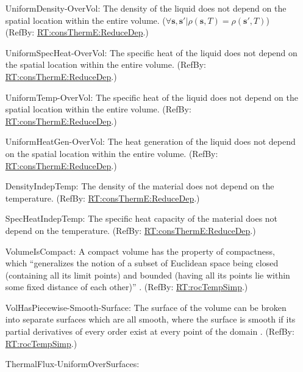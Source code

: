 \documentclass[12pt]{article}
\begin{document}
\begin{itemize}
\item[UniformDensity-OverVol:\phantomsection\label{assumpUnifDens}]{The density
of the liquid does not depend on the spatial location within the entire volume.
($\forall \mathbf{s}, \mathbf{s'} | \rho(\mathbf{s}, T) = \rho(\mathbf{s'}, T)$)
(RefBy: \hyperref[RT:consThermE:ReduceDep]{RT:consThermE:ReduceDep}.)}
\item[UniformSpecHeat-OverVol:\phantomsection\label{assumpUnifSpecHeat}]{The
specific heat of the liquid does not depend on the spatial location within the
entire volume. (RefBy: \hyperref[RT:consThermE:ReduceDep]{RT:consThermE:ReduceDep}.)}
\item[UniformTemp-OverVol:\phantomsection\label{assumpUnifTemp}]{The
specific heat of the liquid does not depend on the spatial location within the
entire volume. (RefBy: \hyperref[RT:consThermE:ReduceDep]{RT:consThermE:ReduceDep}.)}
\item[UniformHeatGen-OverVol:\phantomsection\label{assumpUnifHeatGen}]{The
heat generation of the liquid does not depend on the spatial location within the
entire volume. (RefBy: \hyperref[RT:consThermE:ReduceDep]{RT:consThermE:ReduceDep}.)}
\item[DensityIndepTemp:\phantomsection\label{assumpDensIndepT}]{The density
of the material does not depend on the temperature. (RefBy: \hyperref[RT:consThermE:ReduceDep]{RT:consThermE:ReduceDep}.)}
\item[SpecHeatIndepTemp:\phantomsection\label{assumpSpecHeatIndepT}]{The
specific heat capacity of the material does not depend on the temperature.
(RefBy: \hyperref[RT:consThermE:ReduceDep]{RT:consThermE:ReduceDep}.)}
\item[VolumeIsCompact:\phantomsection\label{assumpVolCompact}]{A compact volume
has the property of compactness, which ``generalizes the notion of a subset of
Euclidean space being closed (containing all its limit points) and bounded
(having all its points lie within some fixed distance of each other)''
\cite{Wiki-CompactSpace2022}. (RefBy:
\hyperref[RT:rocTempSimp]{RT:rocTempSimp}.)}
\item[VolHasPiecewise-Smooth-Surface:\phantomsection\label{assumpPiecewiseSmooth}]
{The surface of the volume can be broken into separate surfaces which are all
smooth, where the surface is smooth if its partial derivatives of every order
exist at every point of the domain \cite{Wiki-DiffGeom2022}. (RefBy:
\hyperref[RT:rocTempSimp]{RT:rocTempSimp}.)}
\item[ThermalFlux-UniformOverSurfaces:\phantomsection\label{assumpUnifThermFlux}]

\end{itemize}
\end{document}
